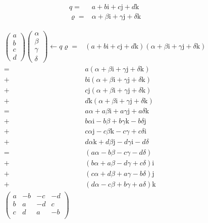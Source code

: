 \documentclass[
]{book}
\theoremstyle{definition}
\theoremstyle{definition}
\theoremstyle{definition}
\theoremstyle{definition}
\theoremstyle{remark}
\begin{document}
\[
\begin{aligned}
q= & a+b\mathrm{i}+c\mathrm{j}+d\mathrm{k}\\
\varrho= & \alpha+\beta\mathrm{i}+\gamma\mathrm{j}+\delta\mathrm{k}
\end{aligned}
\]

\[
\begin{aligned}
\begin{pmatrix}a\\
b\\
c\\
d
\end{pmatrix}\begin{pmatrix}\alpha\\
\beta\\
\gamma\\
\delta
\end{pmatrix}\leftarrow q\varrho= & \left(a+b\mathrm{i}+c\mathrm{j}+d\mathrm{k}\right)\left(\alpha+\beta\mathrm{i}+\gamma\mathrm{j}+\delta\mathrm{k}\right)\\
= & a\left(\alpha+\beta\mathrm{i}+\gamma\mathrm{j}+\delta\mathrm{k}\right)\\
+ & b\mathrm{i}\left(\alpha+\beta\mathrm{i}+\gamma\mathrm{j}+\delta\mathrm{k}\right)\\
+ & c\mathrm{j}\left(\alpha+\beta\mathrm{i}+\gamma\mathrm{j}+\delta\mathrm{k}\right)\\
+ & d\mathrm{k}\left(\alpha+\beta\mathrm{i}+\gamma\mathrm{j}+\delta\mathrm{k}\right)\\
= & a\alpha+a\beta\mathrm{i}+a\gamma\mathrm{j}+a\delta\mathrm{k}\\
+ & b\alpha\mathrm{i}-b\beta+b\gamma\mathrm{k}-b\delta\mathrm{j}\\
+ & c\alpha\mathrm{j}-c\beta\mathrm{k}-c\gamma+c\delta\mathrm{i}\\
+ & d\alpha\mathrm{k}+d\beta\mathrm{j}-d\gamma\mathrm{i}-d\delta\\
= & \left(a\alpha-b\beta-c\gamma-d\delta\right)\\
+ & \left(b\alpha+a\beta-d\gamma+c\delta\right)\mathrm{i}\\
+ & \left(c\alpha+d\beta+a\gamma-b\delta\right)\mathrm{j}\\
+ & \left(d\alpha-c\beta+b\gamma+a\delta\right)\mathrm{k}\\
\begin{pmatrix}a & -b & -c & -d\\
b & a & -d & c\\
c & d & a & -b\\

\end{pmatrix}
\end{aligned}\]
\end{document}
